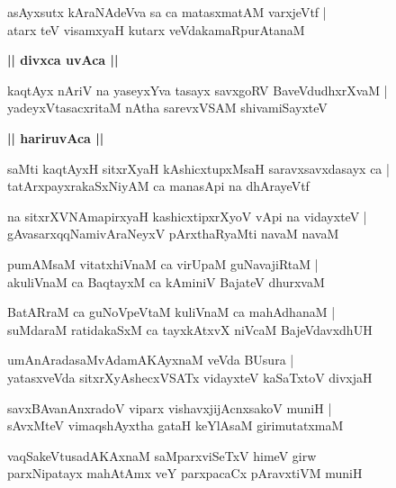 \documentclass[twoside,12pt,openright]{book}
\newcounter{shloka}[chapter]
\def\uvaca#1{\centerline{{\large\textbf{#1}}}}
\begin{document}
\begin{shloka}%
asAyxsutx kAraNAdeVva sa ca matasxmatAM varxjeVtf |\\
atarx teV visamxyaH kutarx veVdakamaRpurAtanaM 
\end{shloka}

\uvaca{|| divxca uvAca ||}

\begin{shloka}%
kaqtAyx nAriV na yaseyxYva tasayx savxgoRV BaveVdudhxrXvaM |\\
yadeyxVtasacxritaM nAtha sarevxVSAM shivamiSayxteV 
\end{shloka}

\uvaca{|| hariruvAca ||}

\begin{shloka}%
saMti kaqtAyxH sitxrXyaH kAshicxtupxMsaH saravxsavxdasayx ca |\\
tatArxpayxrakaSxNiyAM ca manasApi na dhArayeVtf
\end{shloka}

\begin{shloka}%
na sitxrXVNAmapirxyaH kashicxtipxrXyoV vApi na vidayxteV |\\
gAvasarxqqNamivAraNeyxV pArxthaRyaMti navaM navaM 
\end{shloka}

\begin{shloka}%
pumAMsaM vitatxhiVnaM ca virUpaM guNavajiRtaM |\\
akuliVnaM ca BaqtayxM ca kAminiV BajateV dhurxvaM 
\end{shloka}

\begin{shloka}%
BatARraM ca guNoVpeVtaM kuliVnaM ca mahAdhanaM |\\
suMdaraM ratidakaSxM ca tayxkAtxvX niVcaM BajeVdavxdhUH 
\end{shloka}

\begin{shloka}%
umAnAradasaMvAdamAKAyxnaM veVda BUsura |\\
yatasxveVda sitxrXyAshecxVSATx vidayxteV kaSaTxtoV divxjaH 
\end{shloka}

\begin{shloka}%
savxBAvanAnxradoV viparx vishavxjijAcnxsakoV muniH |\\
sAvxMteV vimaqshAyxtha gataH keYlAsaM girimutatxmaM
\end{shloka}

\begin{shloka}%
vaqSakeVtusadAKAxnaM saMparxviSeTxV himeV girw \\
parxNipatayx mahAtAmx veY parxpacaCx pAravxtiVM muniH 
\end{shloka}
\end{document}

